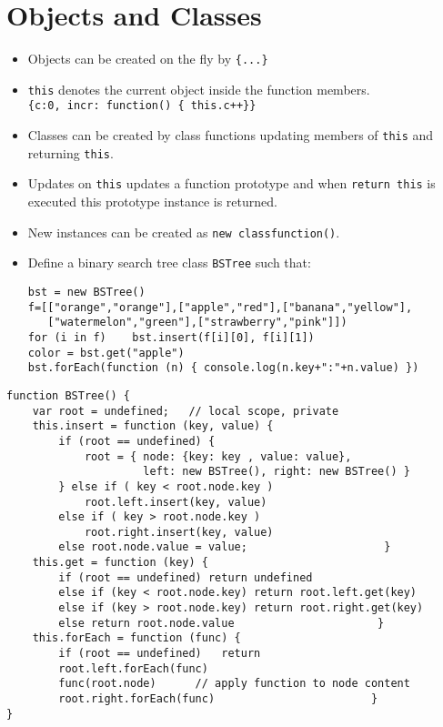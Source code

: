 \documentclass[trans,compress,xcolor=table]{beamer}
\begin{document}
\section{Objects and Classes}
\begin{frame}[fragile]
\begin{itemize}
\item Objects can be created on the fly by \lstinline!{...}!
\item \lstinline!this! denotes the current object inside
	the function members.\\
	\lstinline!{c:0, incr: function() { this.c++}}!
\item Classes can be created by class functions updating members
	of \lstinline!this! and returning \lstinline!this!.
\item Updates on \lstinline!this! updates a function prototype
	and when \lstinline!return this! is executed this
	prototype instance is returned.
\item New instances can be created as \lstinline!new classfunction()!.
\item Define a binary search tree class \lstinline!BSTree! such that:
\begin{lstlisting}
bst = new BSTree()
f=[["orange","orange"],["apple","red"],["banana","yellow"],
   ["watermelon","green"],["strawberry","pink"]])
for (i in f) 	bst.insert(f[i][0], f[i][1])
color = bst.get("apple")
bst.forEach(function (n) { console.log(n.key+":"+n.value) })
\end{lstlisting}
\end{itemize}
\end{frame}
\begin{frame}[fragile]
\begin{lstlisting}
function BSTree() {
    var root = undefined;	// local scope, private 
    this.insert = function (key, value) {
        if (root == undefined) {
            root = { node: {key: key , value: value},
                     left: new BSTree(), right: new BSTree() }
        } else if ( key < root.node.key ) 
            root.left.insert(key, value)
        else if ( key > root.node.key )
            root.right.insert(key, value)
        else root.node.value = value;                     } 
    this.get = function (key) {
        if (root == undefined) return undefined
        else if (key < root.node.key) return root.left.get(key)
        else if (key > root.node.key) return root.right.get(key)
        else return root.node.value                      }
    this.forEach = function (func) {
        if (root == undefined)   return
        root.left.forEach(func)
        func(root.node)      // apply function to node content
        root.right.forEach(func)                        }
}
\end{lstlisting}
\end{frame}
\end{document}
